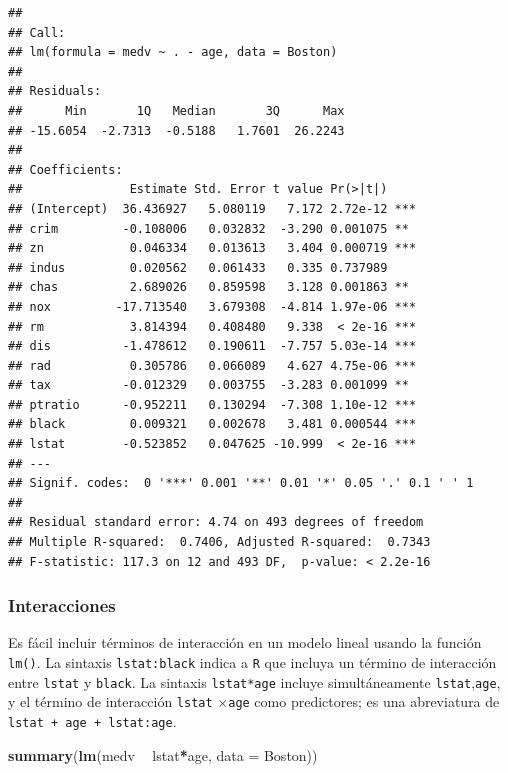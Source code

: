 \documentclass[]{book}
\newenvironment{Shaded}{\begin{snugshade}}{\end{snugshade}}
\newcommand{\KeywordTok}[1]{\textcolor[rgb]{0.13,0.29,0.53}{\textbf{#1}}}
\newcommand{\DataTypeTok}[1]{\textcolor[rgb]{0.13,0.29,0.53}{#1}}
\newcommand{\StringTok}[1]{\textcolor[rgb]{0.31,0.60,0.02}{#1}}
\newcommand{\OperatorTok}[1]{\textcolor[rgb]{0.81,0.36,0.00}{\textbf{#1}}}
\newcommand{\NormalTok}[1]{#1}
\begin{document}
\begin{verbatim}
## 
## Call:
## lm(formula = medv ~ . - age, data = Boston)
## 
## Residuals:
##      Min       1Q   Median       3Q      Max 
## -15.6054  -2.7313  -0.5188   1.7601  26.2243 
## 
## Coefficients:
##               Estimate Std. Error t value Pr(>|t|)    
## (Intercept)  36.436927   5.080119   7.172 2.72e-12 ***
## crim         -0.108006   0.032832  -3.290 0.001075 ** 
## zn            0.046334   0.013613   3.404 0.000719 ***
## indus         0.020562   0.061433   0.335 0.737989    
## chas          2.689026   0.859598   3.128 0.001863 ** 
## nox         -17.713540   3.679308  -4.814 1.97e-06 ***
## rm            3.814394   0.408480   9.338  < 2e-16 ***
## dis          -1.478612   0.190611  -7.757 5.03e-14 ***
## rad           0.305786   0.066089   4.627 4.75e-06 ***
## tax          -0.012329   0.003755  -3.283 0.001099 ** 
## ptratio      -0.952211   0.130294  -7.308 1.10e-12 ***
## black         0.009321   0.002678   3.481 0.000544 ***
## lstat        -0.523852   0.047625 -10.999  < 2e-16 ***
## ---
## Signif. codes:  0 '***' 0.001 '**' 0.01 '*' 0.05 '.' 0.1 ' ' 1
## 
## Residual standard error: 4.74 on 493 degrees of freedom
## Multiple R-squared:  0.7406, Adjusted R-squared:  0.7343 
## F-statistic: 117.3 on 12 and 493 DF,  p-value: < 2.2e-16
\end{verbatim}

\subsubsection{Interacciones}\label{interacciones}

Es fácil incluir términos de interacción en un modelo lineal usando la
función \texttt{lm()}. La sintaxis \texttt{lstat:black} indica a
\texttt{R} que incluya un término de interacción entre \texttt{lstat} y
\texttt{black}. La sintaxis \texttt{lstat*age} incluye simultáneamente
\texttt{lstat},\texttt{age}, y el término de interacción \texttt{lstat}
\(\times\)\texttt{age} como predictores; es una abreviatura de
\texttt{lstat\ +\ age\ +\ lstat:age}.

\begin{Shaded}
\begin{Highlighting}[]
\KeywordTok{summary}\NormalTok{(}\KeywordTok{lm}\NormalTok{(medv }\OperatorTok{~}\StringTok{ }\NormalTok{lstat}\OperatorTok{*}\NormalTok{age, }\DataTypeTok{data =}\NormalTok{ Boston))}
\end{Highlighting}
\end{Shaded}
\end{document}
